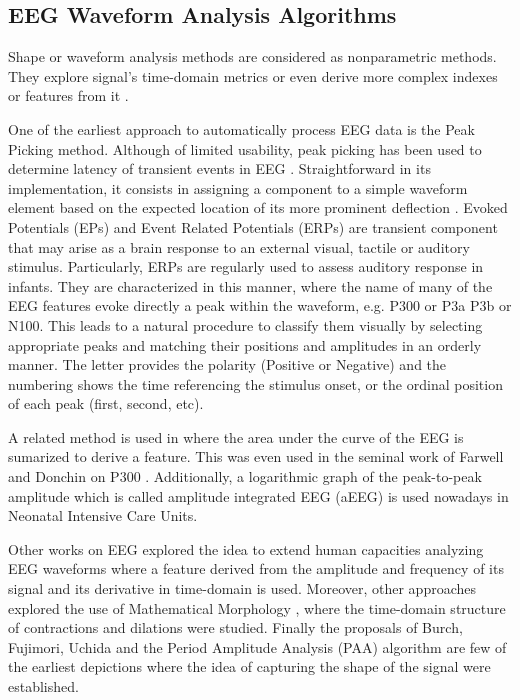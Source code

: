 \documentclass[brainsci,article,submit,moreauthors,pdftex,10pt,a4paper]{mdpi}
\begin{document}
\subsection{EEG Waveform Analysis Algorithms}
\label{Algorithms}

Shape or waveform analysis methods are considered as nonparametric methods.  They explore signal's time-domain metrics or even derive more complex indexes or features from it \citep{Thakor2009}. 

One of the earliest approach to automatically process EEG data is the Peak Picking method.  Although of limited usability, peak picking has been used to determine latency of transient events in EEG \citep{Jaskowski2000,Zhang2011}.  Straightforward in its implementation, it consists in assigning a component to a simple waveform element based on the expected location of its more prominent deflection \citep{Ouyang2017}.  Evoked Potentials (EPs) and Event Related Potentials (ERPs) are transient component that may arise as a brain response to an external visual, tactile or auditory stimulus.  Particularly, ERPs are regularly used to assess auditory response in infants. They are characterized in this manner, where the name of many of the EEG features evoke directly a peak within the waveform, e.g. P300 or P3a P3b or N100.  This leads to a natural procedure to classify them visually by selecting appropriate peaks and matching their positions and amplitudes in an orderly manner.  The letter provides the polarity (Positive or Negative) and the numbering shows the time referencing the stimulus onset, or the ordinal position of each peak (first, second, etc).   

A related method is used in \citep{Alvarado-Gonzalez2016} where the area under the curve of the EEG is sumarized to derive a feature.  This was even used in the seminal work of Farwell and Donchin on P300 \citep{Farwell1988,WolpawJonathanR2012}. Additionally, a logarithmic graph of the peak-to-peak amplitude which is called amplitude integrated EEG (aEEG) \citep{Shah2015} is used nowadays in Neonatal Intensive Care Units.

Other works on EEG explored the idea to extend human capacities analyzing EEG waveforms \citep{Klein1976} where a feature derived from the amplitude and frequency of its signal and its derivative in time-domain is used.  Moreover, other approaches explored the use of Mathematical Morphology \citep{Yamaguchi2009}, where the time-domain structure of contractions and dilations were studied. Finally the proposals of Burch, Fujimori, Uchida and the Period Amplitude Analysis (PAA) \citep{Uchida1996} algorithm are few of the earliest depictions where the idea of capturing the shape of the signal were established.
\end{document}
